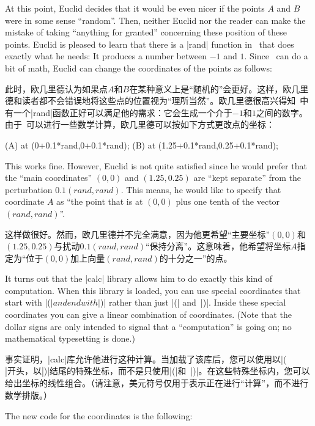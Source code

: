 At this point, Euclid decides that it would be even nicer if the points $A$ and
$B$ were in some sense ``random''. Then, neither Euclid nor the reader can make
the mistake of taking ``anything for granted'' concerning these position of
these points. Euclid is pleased to learn that there is a |rand| function in
\tikzname\ that does exactly what he needs: It produces a number between $-1$
and $1$. Since \tikzname\ can do a bit of math, Euclid can change the
coordinates of the points as follows:
%

此时，欧几里德认为如果点$A$和$B$在某种意义上是“随机的”会更好。这样，欧几里德和读者都不会错误地将这些点的位置视为“理所当然”。欧几里德很高兴得知\tikzname\ 中有一个|rand|函数正好可以满足他的需求：它会生成一个介于$-1$和$1$之间的数字。由于\tikzname\ 可以进行一些数学计算，欧几里德可以按如下方式更改点的坐标：
\begin{codeexample}
\coordinate [...] (A) at (0+0.1*rand,0+0.1*rand);
\coordinate [...] (B) at (1.25+0.1*rand,0.25+0.1*rand);
\end{codeexample}

This works fine. However, Euclid is not quite satisfied since he would prefer
that the ``main coordinates'' $(0,0)$ and $(1.25,0.25)$ are ``kept separate''
from the perturbation $0.1(\mathit{rand},\mathit{rand})$. This means, he would
like to specify that coordinate $A$ as ``the point that is at $(0,0)$ plus one
tenth of the vector  $(\mathit{rand},\mathit{rand})$''.


这样做很好。然而，欧几里德并不完全满意，因为他更希望“主要坐标”$(0,0)$和$(1.25,0.25)$与扰动$0.1(\mathit{rand},\mathit{rand})$“保持分离”。这意味着，他希望将坐标$A$指定为“位于$(0,0)$加上向量$(\mathit{rand},\mathit{rand})$的十分之一”的点。

It turns out that the |calc| library allows him to do exactly this kind of
computation. When this library is loaded, you can use special coordinates that
start with |($| and end with |$)| rather than just |(| and~|)|. Inside these
special coordinates you can give a linear combination of coordinates. (Note
that the dollar signs are only intended to signal that a ``computation'' is
going on; no mathematical typesetting is done.)

事实证明，|calc|库允许他进行这种计算。当加载了该库后，您可以使用以|($|开头，以|$)|结尾的特殊坐标，而不是只使用|(|和~|)|。在这些特殊坐标内，您可以给出坐标的线性组合。（请注意，美元符号仅用于表示正在进行“计算”，而不进行数学排版。）

The new code for the coordinates is the following:

